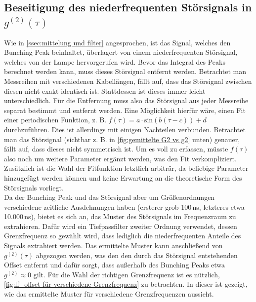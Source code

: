 \subsection{Beseitigung des niederfrequenten Störsignals in \texorpdfstring{$g^{(2)}(\tau)$}{g2}}
\label{ssec:Beseitigung des niederfrequenten Störsignals}
Wie in \autoref{ssec:mittelung und filter} angesprochen, ist das Signal, welches den Bunching Peak beinhaltet, überlagert von einem niederfrequenten Störsignal, welches von der Lampe hervorgerufen wird. 
Bevor das Integral des Peaks berechnet werden kann, muss dieses Störsignal entfernt werden. 
Betrachtet man Messreihen mit verschiedenen Kabellängen, fällt auf, dass das Störsignal zwischen diesen nicht exakt identisch ist. 
Stattdessen ist dieses immer leicht unterschiedlich. 
Für die Entfernung muss also das Störsignal aus jeder Messreihe separat bestimmt und entfernt werden. 
Eine Möglichkeit hierfür wäre, einen Fit einer periodischen Funktion, z. B. $f(\tau) = a\cdot\mathrm{sin}(b(\tau-c))+d$ durchzuführen. 
Dies ist allerdings mit einigen Nachteilen verbunden. 
Betrachtet man das Störsignal (sichtbar z. B. in \autoref{fig:gemittelte G2 vs g2} unten) genauer, fällt auf, dass dieses nicht symmetrisch ist. 
Um es voll zu erfassen, müsste $f(\tau)$ also noch um weitere Parameter ergänzt werden, was den Fit verkompliziert. 
Zusätzlich ist die Wahl der Fitfunktion letztlich arbiträr, da beliebige Parameter hinzugefügt werden können und keine Erwartung an die theoretische Form des Störsignals vorliegt. \\
Da der Bunching Peak und das Störsignal aber um Größenordnungen verschiedene zeitliche Ausdehnungen haben (ersterer grob 100\,ns, letzteres etwa 10{.}000\,ns), bietet es sich an, das Muster des Störsignals im Frequenzraum zu extrahieren. 
Dafür wird ein Tiefpassfilter zweiter Ordnung verwendet, dessen Grenzfrequenz so gewählt wird, dass lediglich die niederfrequenten Anteile des Signals extrahiert werden. 
Das ermittelte Muster kann anschließend von $g^{(2)}(\tau)$ abgezogen werden, was den den durch das Störsignal entstehenden Offset entfernt und dafür sorgt, dass außerhalb des Bunching Peaks etwa $g^{(2)}\approx 0$ gilt. 
Für die Wahl der richtigen Grenzfrequenz ist es nützlich, \autoref{fig:lf_offset für verschiedene Grenzfrequenz} zu betrachten. 
In dieser ist gezeigt, wie das ermittelte Muster für verschiedene Grenzfrequenzen aussieht. 
